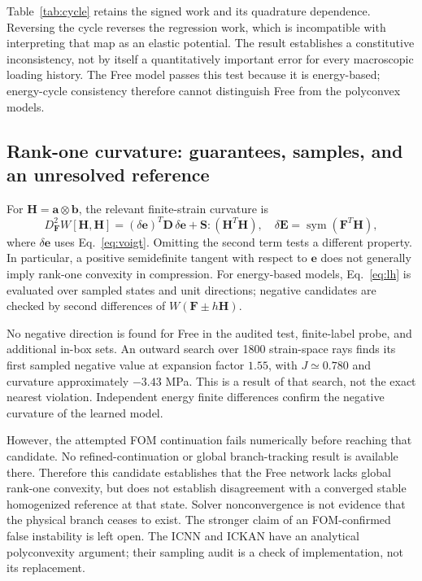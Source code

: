 \documentclass[10pt,a4paper]{article}
\newcommand{\F}{\bm F}
\newcommand{\E}{\bm E}
\newcommand{\Sg}{\bm S}
\newcommand{\ee}{\bm e}
\begin{document}
Table~\ref{tab:cycle} retains the signed work and its quadrature dependence. Reversing the cycle reverses the regression work, which is incompatible with interpreting that map as an elastic potential. The result establishes a constitutive inconsistency, not by itself a quantitatively important error for every macroscopic loading history. The Free model passes this test because it is energy-based; energy-cycle consistency therefore cannot distinguish Free from the polyconvex models.
\begin{table}[htbp]
 \centering\small
 \caption{Closed-cycle work under quadrature refinement.}
 \label{tab:cycle}
 
\end{table}

\subsection{Rank-one curvature: guarantees, samples, and an unresolved reference}
For $\bm H=\bm a\otimes\bm b$, the relevant finite-strain curvature is
\begin{equation}
 D^2_{\F}W[\bm H,\bm H]
   =(\delta\ee)^T\bm D\,\delta\ee+\Sg:(\bm H^T\bm H),\quad
 \delta\E=\operatorname{sym}(\F^T\bm H),
 \label{eq:lh}
\end{equation}
where $\delta\ee$ uses Eq.~\eqref{eq:voigt}. Omitting the second term tests a different property. In particular, a positive semidefinite tangent with respect to $\ee$ does not generally imply rank-one convexity in compression. For energy-based models, Eq.~\eqref{eq:lh} is evaluated over sampled states and unit directions; negative candidates are checked by second differences of $W(\F\pm h\bm H)$.

\begin{table}[htbp]
 \centering\small
 \caption{Finite rank-one curvature audit. Positive sampled values do not establish a global property.}
 \label{tab:rankone}
 
\end{table}

No negative direction is found for Free in the audited test, finite-label probe, and additional in-box sets. An outward search over 1800 strain-space rays finds its first sampled negative value at expansion factor $1.55$, with $J\simeq0.780$ and curvature approximately $-3.43$ MPa. This is a result of that search, not the exact nearest violation. Independent energy finite differences confirm the negative curvature of the learned model.

However, the attempted FOM continuation fails numerically before reaching that candidate. No refined-continuation or global branch-tracking result is available there. Therefore this candidate establishes that the Free network lacks global rank-one convexity, but does not establish disagreement with a converged stable homogenized reference at that state. Solver nonconvergence is not evidence that the physical branch ceases to exist. The stronger claim of an FOM-confirmed false instability is left open. The ICNN and ICKAN have an analytical polyconvexity argument; their sampling audit is a check of implementation, not its replacement.
\end{document}
